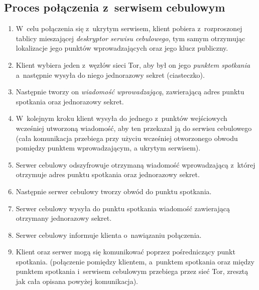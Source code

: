 \subsection{Proces połączenia z~serwisem cebulowym\label{polaczenie_z_serwisem}}
\begin{enumerate}
 \item W~celu połączenia się z~ukrytym serwisem, klient pobiera z~rozproszonej tablicy mieszającej \textit{deskryptor serwisu cebulowego}, tym samym otrzymując lokalizacje jego punktów wprowadzających oraz jego klucz publiczny.
 \item Klient wybiera jeden z~węzłów sieci Tor, aby był on jego \textit{punktem spotkania} a~następnie wysyła do niego jednorazowy sekret (ciasteczko).
 \item Następnie tworzy on \textit{wiadomość wprowadzającą}, zawierającą adres punktu spotkania oraz jednorazowy sekret.
 \item W~kolejnym kroku klient wysyła do jednego z~punktów wejściowych wcześniej utworzoną wiadomość, aby ten przekazał ją do serwisu cebulowego (cała komunikacja przebiega przy użyciu wcześniej otworzonego obwodu pomiędzy punktem wprowadzającym, a ukrytym serwisem).
 \item Serwer cebulowy odszyfrowuje otrzymaną wiadomość wprowadzającą z~której otrzymuje adres punktu spotkania oraz jednorazowy sekret.
 \item Następnie serwer cebulowy tworzy obwód do punktu spotkania.
 \item Serwer cebulowy wysyła do punktu spotkania wiadomość zawierającą otrzymany jednorazowy sekret.
 \item Serwer cebulowy informuje klienta o~nawiązaniu połączenia.
 \item Klient oraz serwer mogą się komunikować poprzez pośredniczący punkt spotkania. (połączenie pomiędzy klientem, a~punktem spotkania oraz między punktem spotkania i~serwisem cebulowym przebiega przez sieć Tor, zresztą jak cała opisana powyżej komunikacja)\cite{torproject_services}.
\end{enumerate}

